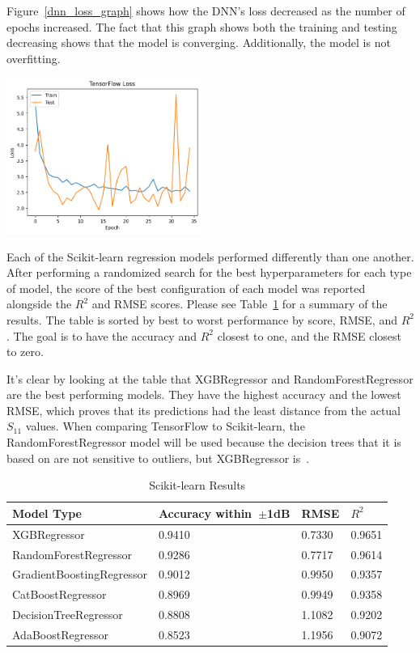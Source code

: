 \documentclass[lettersize,journal]{IEEEtran}
\newenvironment{Figure}
    {\par\medskip\noindent\minipage{\linewidth}}
    {\endminipage\par\medskip}
\begin{document}
Figure~\ref{dnn_loss_graph} shows how the DNN's loss decreased as the number of epochs increased. The fact that this graph shows both the training and testing decreasing shows that the model is converging. Additionally, the model is not overfitting. 

\begin{Figure}
    \centering
    \includegraphics[width=2.5in]{loss}
    \label{dnn_loss_graph}
\end{Figure}

Each of the Scikit-learn regression models performed differently than one another. After performing a randomized search for the best hyperparameters for each type of model, the score of the best configuration of each model was reported alongside the $R^2$ and RMSE scores. Please see Table~\ref{comparing_sklearn} for a summary of the results. The table is sorted by best to worst performance by score, RMSE, and $R^2$. The goal is to have the accuracy and $R^2$ closest to one, and the RMSE closest to zero. 

It's clear by looking at the table that XGBRegressor and RandomForestRegressor are the best performing models. They have the highest accuracy and the lowest RMSE, which proves that its predictions had the least distance from the actual $S_{11}$ values. When comparing TensorFlow to Scikit-learn, the RandomForestRegressor model will be used because the decision trees that it is based on are not sensitive to outliers, but XGBRegressor is~\cite{BROWN2009541,Li_2018}. 

\begin{table}[h]
\caption{Scikit-learn Results}
\begin{center}
\begin{tabular}{ |l|l|l|l| }
    \hline
    Model Type & Accuracy within~$\pm$1dB & RMSE & $R^2$ \\ 
    \hline
    XGBRegressor & 0.9410 & 0.7330 & 0.9651 \\  
    \hline
    RandomForestRegressor & 0.9286 & 0.7717 & 0.9614 \\
    \hline  
    GradientBoostingRegressor & 0.9012 & 0.9950 & 0.9357 \\
    \hline
    CatBoostRegressor & 0.8969 & 0.9949 & 0.9358 \\    
    \hline
    DecisionTreeRegressor & 0.8808 & 1.1082 & 0.9202 \\  
    \hline
    AdaBoostRegressor & 0.8523 & 1.1956 & 0.9072 \\  
    \hline
\end{tabular}
\end{center}
\label{comparing_sklearn}
\end{table}
\end{document}
